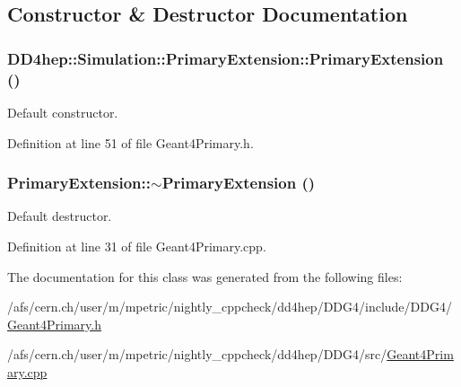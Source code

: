 \subsection{Constructor \& Destructor Documentation}
\hypertarget{class_d_d4hep_1_1_simulation_1_1_primary_extension_af38d37160f1a2bcc08ac36aa866be163}{
\subsubsection[{PrimaryExtension}]{\setlength{\rightskip}{0pt plus 5cm}DD4hep::Simulation::PrimaryExtension::PrimaryExtension ()}}
\label{class_d_d4hep_1_1_simulation_1_1_primary_extension_af38d37160f1a2bcc08ac36aa866be163}


Default constructor. 

Definition at line 51 of file Geant4Primary.h.\hypertarget{class_d_d4hep_1_1_simulation_1_1_primary_extension_a5fb5927720e46d98279b72bfe42c061f}{
\subsubsection[{$\sim$PrimaryExtension}]{\setlength{\rightskip}{0pt plus 5cm}PrimaryExtension::$\sim$PrimaryExtension ()}}
\label{class_d_d4hep_1_1_simulation_1_1_primary_extension_a5fb5927720e46d98279b72bfe42c061f}


Default destructor. 

Definition at line 31 of file Geant4Primary.cpp.

The documentation for this class was generated from the following files:\begin{DoxyCompactItemize}
\item 
/afs/cern.ch/user/m/mpetric/nightly\_\-cppcheck/dd4hep/DDG4/include/DDG4/\hyperlink{_geant4_primary_8h}{Geant4Primary.h}\item 
/afs/cern.ch/user/m/mpetric/nightly\_\-cppcheck/dd4hep/DDG4/src/\hyperlink{_geant4_primary_8cpp}{Geant4Primary.cpp}\end{DoxyCompactItemize}
